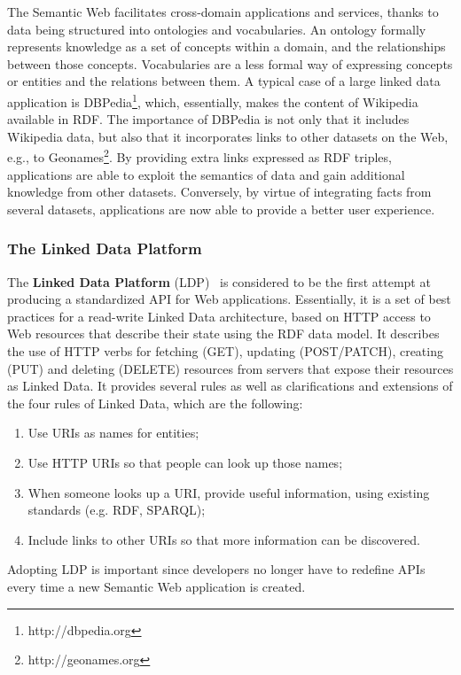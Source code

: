 The Semantic Web facilitates cross-domain applications and services, thanks to data being structured into ontologies and vocabularies. An ontology formally represents knowledge as a set of concepts within a domain, and the relationships between those concepts. Vocabularies are a less formal way of expressing concepts or entities and the relations between them. A typical case of a large linked data application is DBPedia\footnote{http://dbpedia.org}, which, essentially, makes the content of Wikipedia available in RDF. The importance of DBPedia is not only that it includes Wikipedia data, but also that it incorporates links to other datasets on the Web, e.g., to Geonames\footnote{http://geonames.org}. By providing extra links expressed as RDF triples, applications are able to exploit the semantics of data and gain additional knowledge from other datasets. Conversely, by virtue of integrating facts from several datasets, applications are now able to provide a better user experience.\\

\subsubsection{The Linked Data Platform}
The \textbf{Linked Data Platform} (LDP)~\cite{ldp2013} is considered to be the first attempt at producing a standardized API for Web applications. Essentially, it is a set of best practices for a read-write Linked Data architecture, based on HTTP access to Web resources that describe their state using the RDF data model. It describes the use of HTTP verbs for fetching (GET), updating (POST/PATCH), creating (PUT) and deleting (DELETE) resources from servers that expose their resources as Linked Data. It provides several rules as well as clarifications and extensions of the four rules of Linked Data, which are the following:

\begin{enumerate}
  \item Use URIs as names for entities;
  \item Use HTTP URIs so that people can look up those names;
  \item When someone looks up a URI, provide useful information, using existing standards (e.g. RDF, SPARQL);
  \item Include links to other URIs so that more information can be discovered.
\end{enumerate}

Adopting LDP is important since developers no longer have to redefine APIs every time a new Semantic Web application is created.\\

